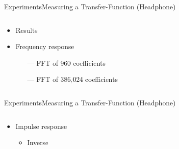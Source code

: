 \begin{frame}{Experiments}{Measuring a Transfer-Function (Headphone)}		
	\begin{columns}
		\begin{column}{0.3\textwidth}
			\begin{itemize}
				\item Results
				\item Frequency response
				\begin{itemize}
					\item[\textcolor{MATLABorange}{---}] FFT of 960 coefficients
					\item[\textcolor{MATLABblue}{---}] FFT of 386,024 coefficients
				\end{itemize}
			\end{itemize}
		\end{column}
		\begin{column}{0.7\textwidth} 
			\begin{figure}[h]
				
			\end{figure}
		\end{column}
	\end{columns}
\end{frame}
\begin{frame}{Experiments}{Measuring a Transfer-Function (Headphone)}		
	\begin{columns}
		\begin{column}{1\textwidth}
			\begin{itemize}
				\item Impulse response
				\begin{itemize}
					\item Inverse
				\end{itemize}
			\end{itemize}
			\begin{figure}[h]
				
			\end{figure}
		\end{column}
	\end{columns}
\end{frame}


